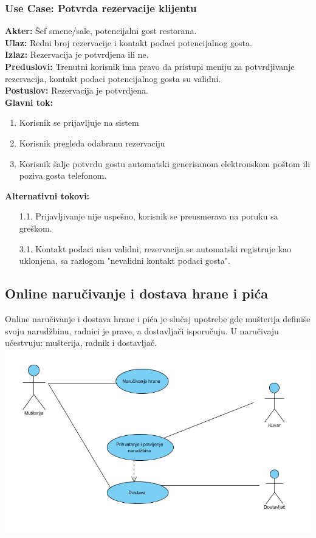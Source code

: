 \documentclass{article}
\begin{document}
\subsubsection{\textbf{Use Case}: Potvrda rezervacije klijentu}
\textbf{Akter:} Šef smene/sale, potencijalni gost restorana.\\
\textbf{Ulaz:} Redni broj rezervacije i kontakt podaci potencijalnog gosta.\\
\textbf{Izlaz:} Rezervacija je potvrdjena ili ne.\\
\textbf{Preduslovi:} Trenutni korisnik ima pravo da pristupi meniju za potvrdjivanje rezervacija, kontakt podaci potencijalnog gosta su validni.\\
\textbf{Postuslov:} Rezervacija je potvrdjena.\\
\textbf{Glavni tok:}
\begin{enumerate}
\item Korisnik se prijavljuje na sistem
\item Korisnik pregleda odabranu rezervaciju
\item Korisnik šalje potvrdu gostu automatski generisanom elektronskom poštom ili poziva gosta telefonom.\\
\end{enumerate}
\textbf{Alternativni tokovi:}\\
\begin{itemize}
\item [1.1.] Prijavljivanje nije uspešno, korisnik se preusmerava na poruku sa greškom.
\item [3.1.] Kontakt podaci nisu validni, rezervacija se automatski registruje kao uklonjena, sa razlogom "nevalidni kontakt podaci gosta".
\end{itemize}
  

\subsection{Online naručivanje i dostava hrane i pića}
Online naručivanje i dostava hrane i pića je slučaj upotrebe gde mušterija definiše svoju narudžbinu, radnici je prave, a dostavljači isporučuju. U naručivaju učestvuju: mušterija, radnik i dostavljač.
\\
\includegraphics[width=\linewidth]{SU_6_dostava.png}
\end{document}
